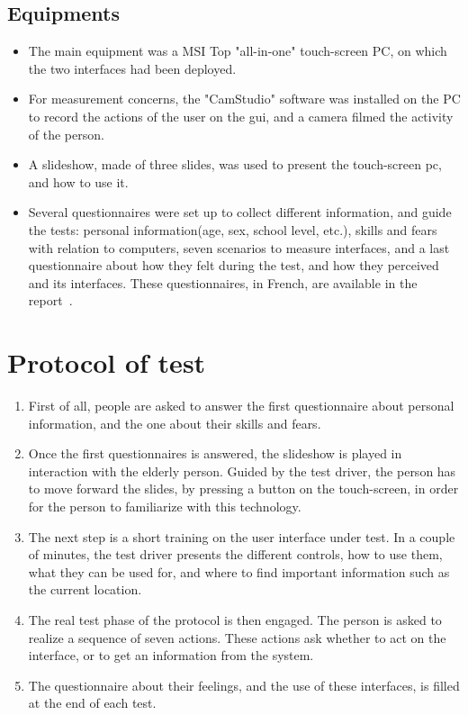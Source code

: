 \subsection{Equipments}
\begin{itemize}
\item The main equipment was a MSI Top "all-in-one" touch-screen PC, on which the two interfaces had been deployed.
\item For measurement concerns, the "CamStudio" software was installed on the PC to record the actions of the user on the \gls{gui}, and a camera filmed the activity of the person.
\item A slideshow, made of three slides, was used to present the touch-screen pc, and how to use it.
\item Several questionnaires were set up to collect different information, and guide the tests: personal information(age, sex, school level, etc.), skills and fears with relation to computers, seven scenarios to measure interfaces, and a last questionnaire about how they felt during the test, and how they perceived \enti{} and its interfaces. These questionnaires, in French, are available in the report~\cite{COLAS:2009}.

\end{itemize}


\section{Protocol of test}
\begin{enumerate}
\item First of all, people are asked to answer the first questionnaire about personal information, and the one about their skills and fears.
\item Once the first questionnaires is answered, the slideshow is played in interaction with the elderly person. Guided by the test driver, the person has to move forward the slides, by pressing a button on the touch-screen, in order for the person to familiarize with this technology.
\item The next step is a short training on the user interface under test. In a couple of minutes, the test driver presents the different controls, how to use them, what they can be used for, and where to find important information such as the current location.
\item The real test phase of the protocol is then engaged. The person is asked to realize a sequence of seven actions. These actions ask whether to act on the interface, or to get an information from the system.
\item The questionnaire about their feelings, and the use of these interfaces, is filled at the end of each test.

\end{enumerate}

